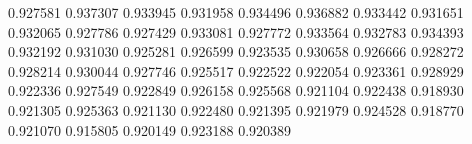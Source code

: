 0.927581
0.937307
0.933945
0.931958
0.934496
0.936882
0.933442
0.931651
0.932065
0.927786
0.927429
0.933081
0.927772
0.933564
0.932783
0.934393
0.932192
0.931030
0.925281
0.926599
0.923535
0.930658
0.926666
0.928272
0.928214
0.930044
0.927746
0.925517
0.922522
0.922054
0.923361
0.928929
0.922336
0.927549
0.922849
0.926158
0.925568
0.921104
0.922438
0.918930
0.921305
0.925363
0.921130
0.922480
0.921395
0.921979
0.924528
0.918770
0.921070
0.915805
0.920149
0.923188
0.920389
